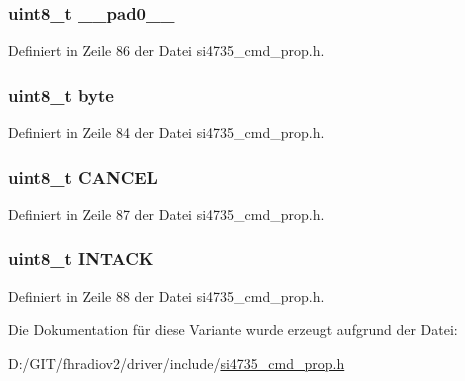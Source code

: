 \subsubsection[{\+\_\+\+\_\+pad0\+\_\+\+\_\+}]{\setlength{\rightskip}{0pt plus 5cm}uint8\+\_\+t \+\_\+\+\_\+pad0\+\_\+\+\_\+}\label{unionfm__tune__status__arg1_a8b4eebe79ded0459acec2f4950102ba3}


Definiert in Zeile 86 der Datei si4735\+\_\+cmd\+\_\+prop.\+h.

\hypertarget{unionfm__tune__status__arg1_a96f44d20f1dbf1c8785a7bc99a46164c}{}
\subsubsection[{byte}]{\setlength{\rightskip}{0pt plus 5cm}uint8\+\_\+t byte}\label{unionfm__tune__status__arg1_a96f44d20f1dbf1c8785a7bc99a46164c}


Definiert in Zeile 84 der Datei si4735\+\_\+cmd\+\_\+prop.\+h.

\hypertarget{unionfm__tune__status__arg1_ac030f6cac29ec43cc0457a01f7ea9f93}{}
\subsubsection[{C\+A\+N\+C\+E\+L}]{\setlength{\rightskip}{0pt plus 5cm}uint8\+\_\+t C\+A\+N\+C\+E\+L}\label{unionfm__tune__status__arg1_ac030f6cac29ec43cc0457a01f7ea9f93}


Definiert in Zeile 87 der Datei si4735\+\_\+cmd\+\_\+prop.\+h.

\hypertarget{unionfm__tune__status__arg1_adf4f80d8fb205d6c93c6423d84d63d9c}{}
\subsubsection[{I\+N\+T\+A\+C\+K}]{\setlength{\rightskip}{0pt plus 5cm}uint8\+\_\+t I\+N\+T\+A\+C\+K}\label{unionfm__tune__status__arg1_adf4f80d8fb205d6c93c6423d84d63d9c}


Definiert in Zeile 88 der Datei si4735\+\_\+cmd\+\_\+prop.\+h.



Die Dokumentation für diese Variante wurde erzeugt aufgrund der Datei\+:\begin{DoxyCompactItemize}
\item 
D\+:/\+G\+I\+T/fhradiov2/driver/include/\hyperlink{si4735__cmd__prop_8h}{si4735\+\_\+cmd\+\_\+prop.\+h}\end{DoxyCompactItemize}
